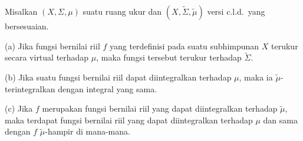  Misalkan $(X,\Sigma,\mu)$ suatu ruang ukur dan
$(X,\tilde\Sigma,\tilde\mu)$ versi c.l.d.\ yang bersesuaian.

(a) Jika fungsi bernilai riil $f$ yang terdefinisi pada suatu subhimpunan
$X$ terukur secara virtual terhadap $\mu$, maka fungsi tersebut terukur terhadap
$\tilde\Sigma$.

(b) Jika suatu fungsi bernilai riil dapat diintegralkan terhadap $\mu$, maka ia
$\tilde\mu$-terintegralkan dengan integral yang sama.

(c) Jika $f$ merupakan fungsi bernilai riil yang dapat diintegralkan terhadap
$\tilde\mu$, maka terdapat fungsi bernilai riil yang dapat diintegralkan
terhadap $\mu$ dan sama dengan
$f\,\,\tilde\mu$-hampir di mana-mana.

